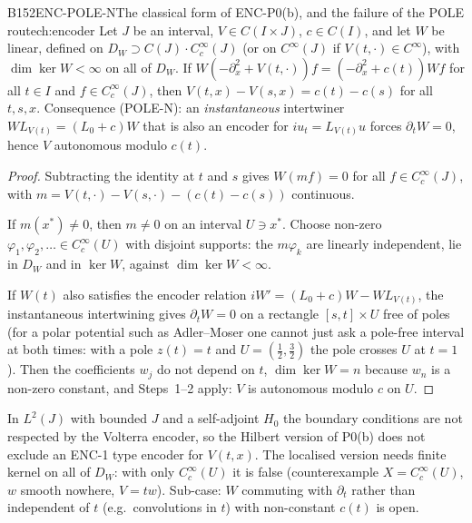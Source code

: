 \begin{dimcard}{B152}{ENC-POLE-N}{The classical form of ENC-P0(b), and the failure of the POLE route}{\pw}{ch:encoder}
Let $J$ be an interval, $V\in C(I\times J)$, $c\in C(I)$, and let $W$ be linear, defined on $D_W\supset C(J)\cdot C_c^\infty(J)$ (or on $C^\infty(J)$ if $V(t,\cdot)\in C^\infty$), with $\dim\ker W<\infty$ on all of $D_W$. If $W(-\partial_x^2+V(t,\cdot))f=(-\partial_x^2+c(t))Wf$ for all $t\in I$ and $f\in C_c^\infty(J)$, then $V(t,x)-V(s,x)=c(t)-c(s)$ for all $t,s,x$. Consequence (POLE-N): an \emph{instantaneous} intertwiner $WL_{V(t)}=(L_0+c)W$ that is also an encoder for $iu_t=L_{V(t)}u$ forces $\partial_tW=0$, hence $V$ autonomous modulo $c(t)$.
\end{dimcard}

\begin{proof}
Subtracting the identity at $t$ and $s$ gives $W(mf)=0$ for all $f\in C_c^\infty(J)$, with $m=V(t,\cdot)-V(s,\cdot)-(c(t)-c(s))$ continuous.

If $m(x^*)\ne0$, then $m\ne0$ on an interval $U\ni x^*$. Choose non-zero $\varphi_1,\varphi_2,\dots\in C_c^\infty(U)$ with disjoint supports: the $m\varphi_k$ are linearly independent, lie in $D_W$ and in $\ker W$, against $\dim\ker W<\infty$.

If $W(t)$ also satisfies the encoder relation $iW'=(L_0+c)W-WL_{V(t)}$, the instantaneous intertwining gives $\partial_tW=0$ on a rectangle $[s,t]\times U$ free of poles (for a polar potential such as Adler--Moser one cannot just ask a pole-free interval at both times: with a pole $z(t)=t$ and $U=(\frac12,\frac32)$ the pole crosses $U$ at $t=1$). Then the coefficients $w_j$ do not depend on $t$, $\dim\ker W=n$ because $w_n$ is a non-zero constant, and Steps~1--2 apply: $V$ is autonomous modulo $c$ on $U$.

\end{proof}

\begin{caution}[title={Scope}]
In $L^2(J)$ with bounded $J$ and a self-adjoint $H_0$ the boundary conditions are not respected by the Volterra encoder, so the Hilbert version of P0(b) does not exclude an ENC-1 type encoder for $V(t,x)$. The localised version needs finite kernel on all of $D_W$: with only $C_c^\infty(U)$ it is false (counterexample $X=C_c^\infty(U)$, $w$ smooth nowhere, $V=tw$). Sub-case: $W$ commuting with $\partial_t$ rather than independent of $t$ (e.g.\ convolutions in $t$) with non-constant $c(t)$ is open.
\end{caution}

